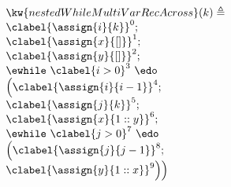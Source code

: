 \begin{example}
  \begin{figure}
    \centering
    {\footnotesize
    \begin{subfigure}{.4\textwidth}
    \begin{centering}
    $ 
    \begin{array}{l}
      \kw{nestedWhileMultiVarRecAcross}(k) \triangleq \\
      \clabel{\assign{i}{k} }^{0} ; \\
      \clabel{ \assign{x}{[]}}^{1} ; \\
      \clabel{ \assign{y}{[]}}^{2} ; \\
          \ewhile ~ \clabel{i > 0}^{3} ~ \edo ~ \\
          \Big(
           \clabel{\assign{i}{i-1}}^{4} ;\\
           \clabel{\assign{j}{k}}^{5} ;\\
           \clabel{\assign{x}{1::y} }^{6}  ; \\
           \ewhile ~ \clabel{j > 0}^{7} ~ \edo ~ \\
           \Big(
            \clabel{\assign{j}{j-1}}^{8};\\
            \clabel{\assign{y}{ 1::x }}^{9}
            \Big) \Big)
      \end{array}
    $
    \caption{}
    \end{centering}
    \end{subfigure}
    \quad
    \begin{subfigure}{.52\textwidth}
      \begin{centering}
      \begin{tikzpicture}[scale=\textwidth/18cm,samples=200]

\end{tikzpicture}
\end{centering}
\end{subfigure}}
\end{figure}
\end{example}

